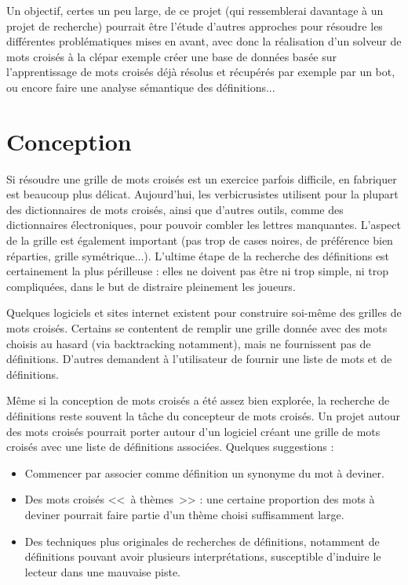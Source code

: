 \documentclass{article}
\begin{document}
Un objectif, certes un peu large, de ce projet (qui ressemblerai davantage à un projet de recherche) pourrait être l'étude d'autres approches pour résoudre les différentes problématiques mises en avant, avec donc la réalisation d'un solveur de mots croisés à la clépar exemple créer une base de données basée sur l'apprentissage de mots croisés déjà résolus et récupérés par exemple par un bot, ou encore faire une analyse sémantique des définitions...

\section{Conception}

Si résoudre une grille de mots croisés est un exercice parfois difficile, en fabriquer est beaucoup plus délicat. Aujourd'hui, les verbicrusistes utilisent pour la plupart des dictionnaires de mots croisés, ainsi que d'autres outils, comme des dictionnaires électroniques, pour pouvoir combler les lettres manquantes. L'aspect de la grille est également important (pas trop de cases noires, de préférence bien réparties, grille symétrique...). L'ultime étape de la recherche des définitions est certainement la plus périlleuse : elles ne doivent pas être ni trop simple, ni trop compliquées, dans le but de distraire pleinement les joueurs.

Quelques logiciels et sites internet existent pour construire soi-même des grilles de mots croisés. Certains se contentent de remplir une grille donnée avec des mots choisis au hasard (via backtracking notamment), mais ne fournissent pas de définitions. D'autres demandent à l'utilisateur de fournir une liste de mots et de définitions.

Même si la conception de mots croisés a été assez bien explorée, la recherche de définitions reste souvent la tâche du concepteur de mots croisés. Un projet autour des mots croisés pourrait porter autour d'un logiciel créant une grille de mots croisés avec une liste de définitions associées. Quelques suggestions :

\begin{itemize}
	\item Commencer par associer comme définition un synonyme du mot à deviner.
	\item Des mots croisés <<~à thèmes~>> : une certaine proportion des mots à deviner pourrait faire partie d'un thème choisi suffisamment large.
	\item Des techniques plus originales de recherches de définitions, notamment de définitions pouvant avoir plusieurs interprétations, susceptible d'induire le lecteur dans une mauvaise piste.
\end{itemize}
\end{document}
